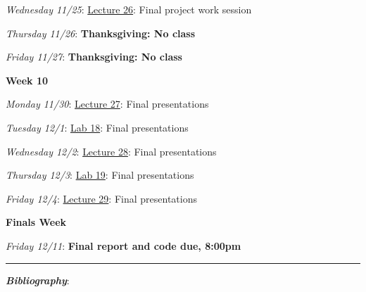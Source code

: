 \documentclass[12pt]{article}
\begin{document}
\emph{Wednesday 11/25}: \underline{Lecture 26}: Final project work session

\emph{Thursday 11/26}: \textbf{Thanksgiving: No class}

\emph{Friday 11/27}: \textbf{Thanksgiving: No class}

\noindent\textbf{Week 10}

\emph{Monday 11/30}: \underline{Lecture 27}: Final presentations

\emph{Tuesday 12/1}: \underline{Lab 18}: Final presentations

\emph{Wednesday 12/2}: \underline{Lecture 28}: Final presentations

\emph{Thursday 12/3}: \underline{Lab 19}: Final presentations

\emph{Friday 12/4}: \underline{Lecture 29}: Final presentations

\noindent\textbf{Finals Week}

\emph{Friday 12/11}: \textbf{Final report and code due, 8:00pm}

\begin{center}
  \rule{\textwidth}{0.5pt}
\end{center}
\nocite{*}

\noindent\textbf{\emph{Bibliography}}:\\
\printbibliography[heading=none]
\end{document}
